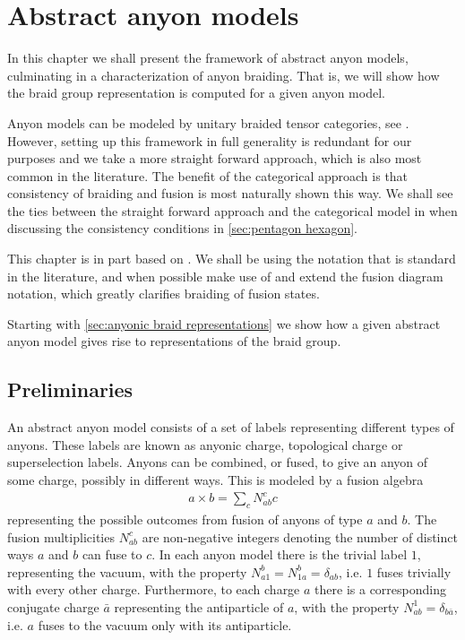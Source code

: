 \documentclass[a4paper,10pt,oneside]{book}
\theoremstyle{plain}
\theoremstyle{definition}
\theoremstyle{remark}
\begin{document}
\chapter{Abstract anyon models}\label{anyon models}

In this chapter we shall present the framework of abstract anyon models, culminating in a characterization of anyon braiding. That is, we will show how the braid group representation is computed for a given anyon model.

Anyon models can be modeled by unitary braided tensor categories, see \cite{kitaev}. However, setting up this framework in full generality is redundant for our purposes and we take a more straight forward approach, which is also most common in the literature. The benefit of the categorical approach is that consistency of braiding and fusion is most naturally shown this way. We shall see the ties between the straight forward approach and the categorical model in when discussing the consistency conditions in \cref{sec:pentagon hexagon}.

This chapter is in part based on \cite{preskill,kitaev,bonderson}. We shall be using the notation that is standard in the literature, and when possible make use of and extend the fusion diagram notation, which greatly clarifies braiding of fusion states.

Starting with \cref{sec:anyonic braid representations} we show how a given abstract anyon model gives rise to representations of the braid group.

\section{Preliminaries}

An abstract anyon model consists of a set of labels representing different types of anyons. These labels are known as anyonic charge, topological charge or superselection labels. Anyons can be combined, or fused, to give an anyon of some charge, possibly in different ways. This is modeled by a fusion algebra
\begin{align*}
  a \times b = \sum_c N_{ab}^c c
\end{align*}
representing the possible outcomes from fusion of anyons of type $a$ and $b$. The fusion multiplicities $N_{ab}^c$ are non-negative integers denoting the number of distinct ways $a$ and $b$ can fuse to $c$. In each anyon model there is the trivial label $1$, representing the vacuum, with the property $N_{a1}^b = N_{1a}^b = \delta_{ab}$, i.e. $1$ fuses trivially with every other charge. Furthermore, to each charge $a$ there is a corresponding conjugate charge $\bar{a}$ representing the antiparticle of $a$, with the property $N_{ab}^1 = \delta_{b\bar{a}}$, i.e. $a$ fuses to the vacuum only with its antiparticle.
\end{document}
